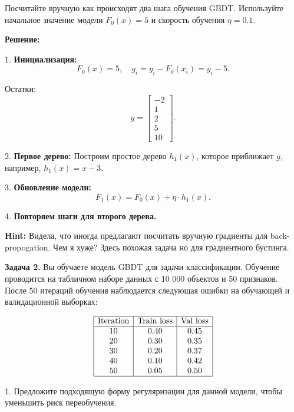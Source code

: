 Посчитайте вручную как происходят два шага обучения GBDT. Используйте начальное значение модели \(F_0(x) = 5\) и скорость обучения \(\eta = 0.1\).

\textbf{Решение:}

1. \textbf{Инициализация:}
\[
    F_0(x) = 5, \quad g_i = y_i - F_0(x_i) = y_i - 5.
\]

Остатки:
\[
    g = \begin{bmatrix} -2 \\ 1 \\ 2 \\ 5 \\ 10 \end{bmatrix}.
\]

2. \textbf{Первое дерево:}
Построим простое дерево \(h_1(x)\), которое приближает \(g\), например, \(h_1(x) = x - 3\).

3. \textbf{Обновление модели:}
\[
    F_1(x) = F_0(x) + \eta \cdot h_1(x).
\]

4. \textbf{Повторяем шаги для второго дерева.}

\textbf{Hint:}
Видела, что иногда предлагают посчитать вручную градиенты для back-propogation. Чем я хуже? Здесь похожая задача но для градиентного бустинга.

\vspace{1cm}

\textbf{Задача 2.}
Вы обучаете модель GBDT для задачи классификации. Обучение проводится на табличном наборе данных с 10 000 объектов и 50 признаков. После 50 итераций обучения наблюдается следующая ошибки на обучающей и валидационной выборках:

\[
    \begin{array}{|c|c|c|}
        \hline
        \text{Iteration} & \text{Train loss} & \text{Val loss} \\
        \hline
        10               & 0.40              & 0.45            \\
        20               & 0.30              & 0.35            \\
        30               & 0.20              & 0.37            \\
        40               & 0.10              & 0.42            \\
        50               & 0.05              & 0.50            \\
        \hline
    \end{array}
\]

1. Предложите подходящую форму регуляризации для данной модели, чтобы уменьшить риск переобучения.

